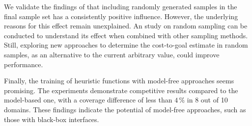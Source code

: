 We validate the findings of \citet{otoole2022sampling} that including randomly generated samples in the final sample set has a consistently positive influence. However, the underlying reasons for this effect remain unexplained. An study on random sampling can be conducted to understand its effect when combined with other sampling methods. Still, exploring new approaches to determine the cost-to-goal estimate in random samples, as an alternative to the current arbitrary value, could improve performance.

Finally, the training of heuristic functions with model-free approaches seems promising. The experiments demonstrate competitive results compared to the model-based one, with a coverage difference of less than $4\,\%$ in 8 out of 10 domains. These findings indicate the potential of model-free approaches, such as those with black-box interfaces.
